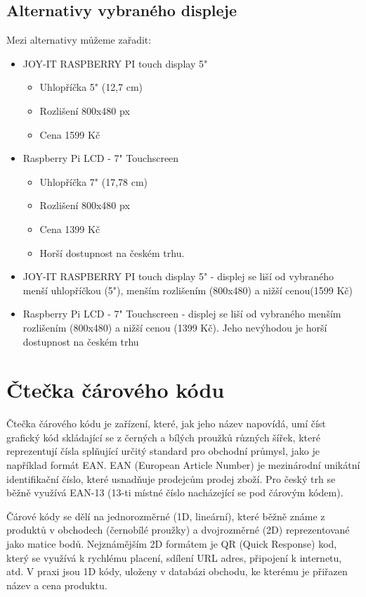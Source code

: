 \subsection{Alternativy vybraného displeje}
Mezi alternativy můžeme zařadit:
\begin{itemize}
    \item JOY-IT RASPBERRY PI touch display 5"
    \begin{itemize}
        \item Uhlopříčka 5" (12,7 cm)
        \item Rozlišení 800x480 px
        \item Cena 1599 Kč
    \end{itemize}
    \item Raspberry Pi LCD - 7" Touchscreen
    \begin{itemize}
        \item Uhlopříčka 7" (17,78 cm)
        \item Rozlišení 800x480 px
        \item Cena 1399 Kč
        \item Horší dostupnost na českém trhu.
    \end{itemize}


    \item JOY-IT RASPBERRY PI touch display 5" - displej se liší od vybraného menší uhlopříčkou (5"), menším rozlišením (800x480) a nižší cenou(1599 Kč)
    \item Raspberry Pi LCD - 7" Touchscreen - displej se liší od vybraného menším rozlišením (800x480) a nižší cenou (1399 Kč). Jeho nevýhodou je horší dostupnost na českém trhu
\end{itemize}


\section{Čtečka čárového kódu}
Čtečka čárového kódu je zařízení, které, jak jeho název napovídá, umí číst grafický kód skládající se z černých a bílých proužků různých šířek, které reprezentují čísla splňující určitý standard pro obchodní průmysl, jako je například formát EAN. EAN (European Article Number) je mezinárodní unikátní identifikační číslo, které usnadňuje prodejcům prodej zboží. Pro český trh se běžně využívá EAN-13 (13-ti místné číslo nacházející se pod čárovým kódem). 

Čárové kódy se dělí na jednorozměrné (1D, lineární), které běžně známe z produktů v obchodech (černobílé proužky) a dvojrozměrné (2D) reprezentované jako matice bodů. Nejznámějším 2D formátem je QR (Quick Response) kod, který se využívá k rychlému placení, sdílení URL adres, připojení k internetu, atd. V praxi jsou 1D kódy, uloženy v databázi obchodu, ke kterému je přiřazen název a cena produktu.

